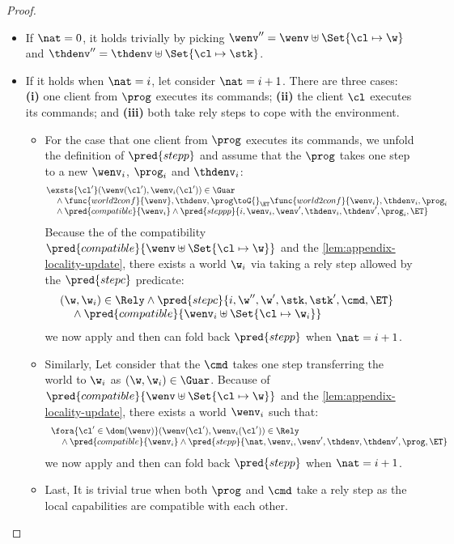\begin{proof}
\begin{itemize}
\begin{itemize}
    \item If \( \nat = 0\), it holds trivially by picking \( \wenv'' = \wenv \uplus \Set{\cl \mapsto \w} \) and \( \thdenv'' = \thdenv \uplus \Set{\cl \mapsto \stk}\).

    \item If it holds when \( \nat = i\), let consider \( \nat = i + 1\).
    There are three cases: \textbf{(i)} one client from \( \prog \) executes its commands; \textbf{(ii)} the client \( \cl \) executes its commands; and \textbf{(iii)} both take rely steps to cope with the environment.
    \begin{itemize}
        \item For the case that one client from \( \prog \) executes its commands, we unfold the definition of \( \pred{stepp} \) and assume that the \( \prog \) takes one step to a new \( \wenv_i\), \( \prog_i \) and \( \thdenv_i \):
        \[
        \begin{array}{@{}l}
            \exsts{\cl'} (\wenv(\cl'), \wenv_i(\cl')) \in \Guar \\ 
            \quad {} \land \func{world2conf}{\wenv}, \thdenv, \prog \toG{}_{\ET} \func{world2conf}{\wenv_i}, \thdenv_i, \prog_i  \\
            \quad {} \land \pred{compatible}{\wenv_i} \land \pred{steppp}{i, \wenv_i, \wenv', \thdenv_i, \thdenv', \prog_i, \ET}
        \end{array}
        \]
        Because the of the compatibility \( \pred{compatible}{\wenv \uplus \Set{\cl \mapsto \w}} \) and the \cref{lem:appendix-locality-update}, there exists a world \( \w_i\) via taking a rely step allowed by the \( \pred{stepc} \) predicate:
        \[
        \begin{array}{@{}l}
            (\w, \w_i) \in \Rely \land \pred{stepc}{i, \w'', \w', \stk, \stk', \cmd, \ET} \\
            \quad {} \land \pred{compatible}{\wenv_i \uplus \Set{\cl \mapsto \w_i}}
        \end{array}
        \]
        we now apply \ih and then can fold back \( \pred{stepp} \) when \( \nat = i + 1 \).
        \item Similarly, Let consider that the \( \cmd \) takes one step transferring the world to \( \w_i \) as \( (\w, \w_i) \in \Guar \).
        Because of \( \pred{compatible}{\wenv \uplus \Set{\cl \mapsto \w}} \) and the \cref{lem:appendix-locality-update}, there exists a world \( \wenv_i\) such that:
        \[
            \begin{array}{l}
            \fora{\cl' \in \dom(\wenv)} (\wenv(\cl'), \wenv_i(\cl')) \in \Rely \\
            \quad {} \land \pred{compatible}{\wenv_i} \land \pred{stepp}{ \nat, \wenv_i, \wenv', \thdenv, \thdenv',\prog, \ET} 
            \end{array}
        \]
        we now apply \ih and then can fold back \( \pred{stepp} \) when \( \nat = i + 1 \).
        \item Last, It is trivial true when both \( \prog\) and \( \cmd \) take a rely step as the local capabilities are compatible with each other.


\end{itemize}
\end{itemize}
\end{itemize}
\end{proof}
